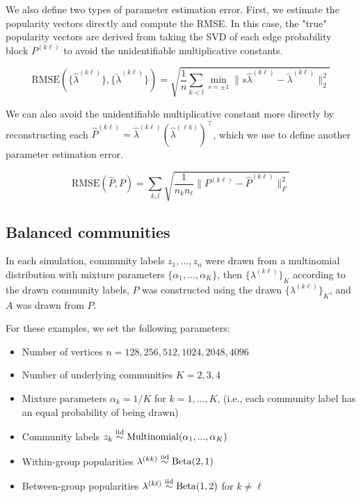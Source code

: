 \documentclass[12pt]{article}
\providecommand{\tightlist}{%
  \setlength{\itemsep}{0pt}\setlength{\parskip}{0pt}}
\begin{document}
We also define two types of parameter estimation error. 
First, we estimate the popularity vectors directly and compute the RMSE. 
In this case, the "true" popularity vectors are derived from 
taking the SVD of each edge probability block $P^{(k \ell)}$ 
to avoid the unidentifiable multiplicative constants. 

\[\text{RMSE}(\{\hat{\lambda}^{(k \ell)}\}, \{\tilde{\lambda}^{(k \ell)}\}) = 
\sqrt{\frac{1}{n} \sum_{k < l} \min_{s = \pm 1} 
\|s \hat{\lambda}^{(k \ell)} - \tilde{\lambda}^{(k \ell)} \|_2^2}\]

We can also avoid the unidentifiable multiplicative constant more directly 
by reconstructing each 
$\hat{P}^{(k \ell)} = \hat{\lambda}^{(k \ell)} (\hat{\lambda}^{(\ell k)})^\top$, 
which we use to define another parameter estimation error. 

\[\text{RMSE}(\hat{P}, P) =
\sum_{k,l} \sqrt{\frac{1}{n_k n_\ell} \|P^{(k \ell)} - \hat{P}^{(k \ell)}\|_F^2}\]

\hypertarget{balanced-communities}{%
\subsection{Balanced communities}\label{balanced-communities}}

In each simulation, community labels \(z_1, ..., z_n\) were drawn from a
multinomial distribution with mixture parameters
\(\{\alpha_1, ..., \alpha_K\}\), then \(\{\lambda^{(k \ell)}\}_K\) according
to the drawn community labels, \(P\) was constructed using the drawn
\(\{\lambda^{(k \ell)}\}_K\), and \(A\) was drawn from \(P\).

For these examples, we set the following parameters:

\begin{itemize}
\tightlist
\item
  Number of vertices \(n = 128, 256, 512, 1024, 2048, 4096\)
\item
  Number of underlying communities \(K = 2, 3, 4\)
\item
  Mixture parameters \(\alpha_k = 1 / K\) for \(k = 1, ..., K\), (i.e.,
  each community label has an equal probability of being drawn)
\item
  Community labels
  \(z_k \stackrel{\text{iid}}{\sim} \mathrm{Multinomial}(\alpha_1, ..., \alpha_K)\)
\item
  Within-group popularities
  \(\lambda^{(kk)} \stackrel{\text{iid}}{\sim} \mathrm{Beta}(2, 1)\)
\item
  Between-group popularities
  \(\lambda^{(k \ell)} \stackrel{\text{iid}}{\sim} \mathrm{Beta}(1, 2)\) for
  \(k \neq \ell\)
\end{itemize}
\end{document}
